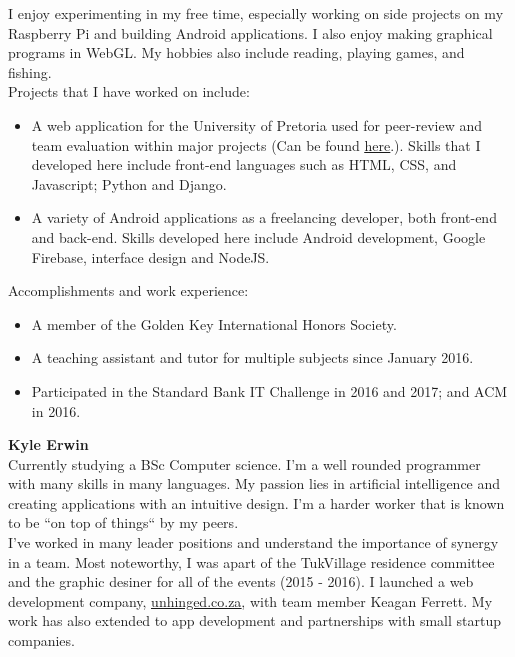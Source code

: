     I enjoy experimenting in my free time, especially working on side projects on my Raspberry Pi and building Android applications. I also enjoy making graphical programs in WebGL. My hobbies also include reading, playing games, and fishing. \\
    
    \noindent
    Projects that I have worked on include:
    \begin{itemize}
        \item A web application for the University of Pretoria used for peer-review and team evaluation within major projects (Can be found \href{https://github.com/teampinocchio/pinocchio/wiki}{\underline{here}}.). Skills that I developed here include front-end languages such as HTML, CSS, and Javascript; Python and Django.
    
        \item A variety of Android applications as a freelancing developer, both front-end and back-end. Skills developed here include Android development, Google Firebase, interface design and NodeJS.
    \end{itemize}
    
    \noindent
	Accomplishments and work experience:
    \begin{itemize}
        \item A member of the Golden Key International Honors Society.
        \item A teaching assistant and tutor for multiple subjects since January 2016.
        \item Participated in the Standard Bank IT Challenge in 2016 and 2017; and ACM in 2016.
    \end{itemize}

\textbf{Kyle Erwin}\\
	Currently studying a BSc Computer science. I'm a well rounded programmer with many skills in many languages. My passion lies in artificial intelligence and creating applications with an intuitive design. I'm a harder worker that is known to be ``on top of things`` by my peers. \\ 

	I've worked in many leader positions and understand the importance of synergy in a team. Most noteworthy, I was apart of the TukVillage residence committee and the graphic desiner for all of the events (2015 - 2016). I launched a web development company, \href{www.unhinged.co.za}{\underline{unhinged.co.za}}, with team member Keagan Ferrett. My work has also extended to app development and partnerships with small startup companies.\\

